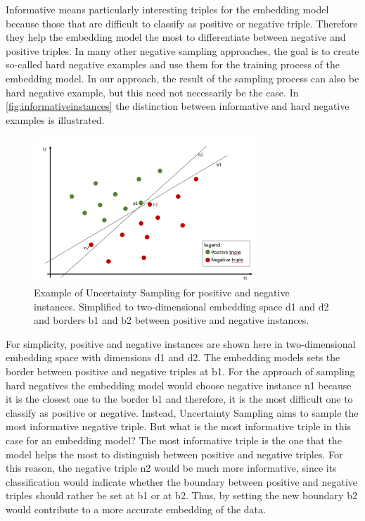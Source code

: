 Informative means particularly interesting triples for the embedding model because those that are difficult to classify as positive or negative triple.
Therefore they help the embedding model the most to differentiate between negative and positive triples.
In many other negative sampling approaches, the goal is to create so-called hard negative examples and use them for the training process of the embedding model. 
In our approach, the result of the sampling process can also be hard negative example, but this need not necessarily be the case.
In \autoref{fig:informativeinstances} the distinction between informative and hard negative examples is illustrated.
\begin{figure}[t]
  \centering
    \includegraphics[width=0.75\textwidth]{figures/informative_instances.PNG}
  \caption{Example of Uncertainty Sampling for positive and negative instances. Simplified to two-dimensional embedding space d1 and d2 and borders b1 and b2 between positive and negative instances.}
  \label{fig:informativeinstances}
\end{figure}
For simplicity, positive and negative instances are shown here in two-dimensional embedding space with dimensions d1 and d2.
The embedding models sets the border between positive and negative triples at b1.
For the approach of sampling hard negatives the embedding model would choose negative instance n1 because it is the closest one to the border b1 and therefore, it is the most difficult one to classify as positive or negative.
Instead, Uncertainty Sampling aims to sample the most informative negative triple.
But what is the most informative triple in this case for an embedding model?
The most informative triple is the one that the model helps the most to distinguish between positive and negative triples.
For this reason, the negative triple n2 would be much more informative, since its classification would indicate whether the boundary between positive and negative triples should rather be set at b1 or at b2.
Thus, by setting the new boundary b2 would contribute to a more accurate embedding of the data.


